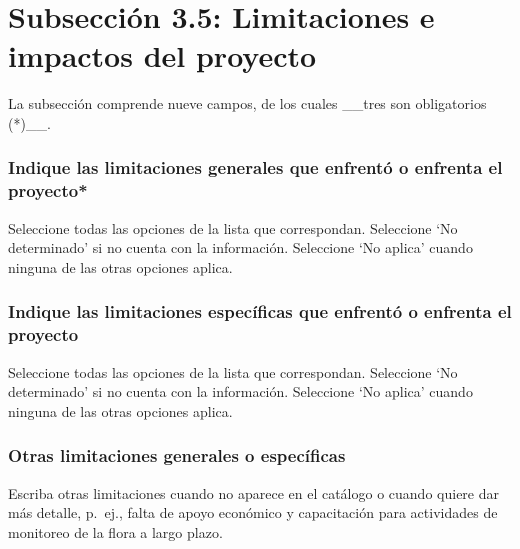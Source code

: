 \documentclass[
]{book}
\begin{document}
\hypertarget{subsecciuxf3n-3.5-limitaciones-e-impactos-del-proyecto}{%
\chapter*{Subsección 3.5: Limitaciones e impactos del proyecto}\label{subsecciuxf3n-3.5-limitaciones-e-impactos-del-proyecto}}

La subsección comprende nueve campos, de los cuales \_\_tres son obligatorios (*)\_\_.

\hypertarget{indique-las-limitaciones-generales-que-enfrentuxf3-o-enfrenta-el-proyecto}{%
\subsection{Indique las limitaciones generales que enfrentó o enfrenta el proyecto*}\label{indique-las-limitaciones-generales-que-enfrentuxf3-o-enfrenta-el-proyecto}}

Seleccione todas las opciones de la lista que correspondan.
Seleccione `No determinado' si no cuenta con la información.
Seleccione `No aplica' cuando ninguna de las otras opciones aplica.

\hypertarget{indique-las-limitaciones-especuxedficas-que-enfrentuxf3-o-enfrenta-el-proyecto}{%
\subsection{Indique las limitaciones específicas que enfrentó o enfrenta el proyecto}\label{indique-las-limitaciones-especuxedficas-que-enfrentuxf3-o-enfrenta-el-proyecto}}

Seleccione todas las opciones de la lista que correspondan.
Seleccione `No determinado' si no cuenta con la información.
Seleccione `No aplica' cuando ninguna de las otras opciones aplica.

\hypertarget{otras-limitaciones-generales-o-especuxedficas}{%
\subsection{Otras limitaciones generales o específicas}\label{otras-limitaciones-generales-o-especuxedficas}}

Escriba otras limitaciones cuando no aparece en el catálogo o cuando quiere dar más detalle, p.~ej., falta de apoyo económico y capacitación para actividades de monitoreo de la flora a largo plazo.
\end{document}
